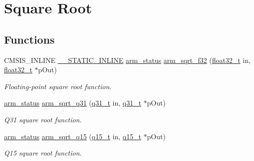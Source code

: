 \hypertarget{group___s_q_r_t}{}\section{Square Root}
\label{group___s_q_r_t}
\subsection*{Functions}
\begin{DoxyCompactItemize}
\item 
C\+M\+S\+I\+S\+\_\+\+I\+N\+L\+I\+NE \mbox{\hyperlink{cmsis__iccarm_8h_aba87361bfad2ae52cfe2f40c1a1dbf9c}{\+\_\+\+\_\+\+S\+T\+A\+T\+I\+C\+\_\+\+I\+N\+L\+I\+NE}} \mbox{\hyperlink{arm__math_8h_a5e459c6409dfcd2927bb8a57491d7cf6}{arm\+\_\+status}} \mbox{\hyperlink{group___s_q_r_t_ga697d82c2747a3302cf44e7c9583da2e8}{arm\+\_\+sqrt\+\_\+f32}} (\mbox{\hyperlink{arm__math_8h_a4611b605e45ab401f02cab15c5e38715}{float32\+\_\+t}} in, \mbox{\hyperlink{arm__math_8h_a4611b605e45ab401f02cab15c5e38715}{float32\+\_\+t}} $\ast$p\+Out)
\begin{DoxyCompactList}\small\item\em Floating-\/point square root function. \end{DoxyCompactList}\item 
\mbox{\hyperlink{arm__math_8h_a5e459c6409dfcd2927bb8a57491d7cf6}{arm\+\_\+status}} \mbox{\hyperlink{group___s_q_r_t_ga119e25831e141d734d7ef10636670058}{arm\+\_\+sqrt\+\_\+q31}} (\mbox{\hyperlink{arm__math_8h_adc89a3547f5324b7b3b95adec3806bc0}{q31\+\_\+t}} in, \mbox{\hyperlink{arm__math_8h_adc89a3547f5324b7b3b95adec3806bc0}{q31\+\_\+t}} $\ast$p\+Out)
\begin{DoxyCompactList}\small\item\em Q31 square root function. \end{DoxyCompactList}\item 
\mbox{\hyperlink{arm__math_8h_a5e459c6409dfcd2927bb8a57491d7cf6}{arm\+\_\+status}} \mbox{\hyperlink{group___s_q_r_t_ga5abe5ca724f3e15849662b03752c1238}{arm\+\_\+sqrt\+\_\+q15}} (\mbox{\hyperlink{arm__math_8h_ab5a8fb21a5b3b983d5f54f31614052ea}{q15\+\_\+t}} in, \mbox{\hyperlink{arm__math_8h_ab5a8fb21a5b3b983d5f54f31614052ea}{q15\+\_\+t}} $\ast$p\+Out)
\begin{DoxyCompactList}\small\item\em Q15 square root function. \end{DoxyCompactList}\end{DoxyCompactItemize}


